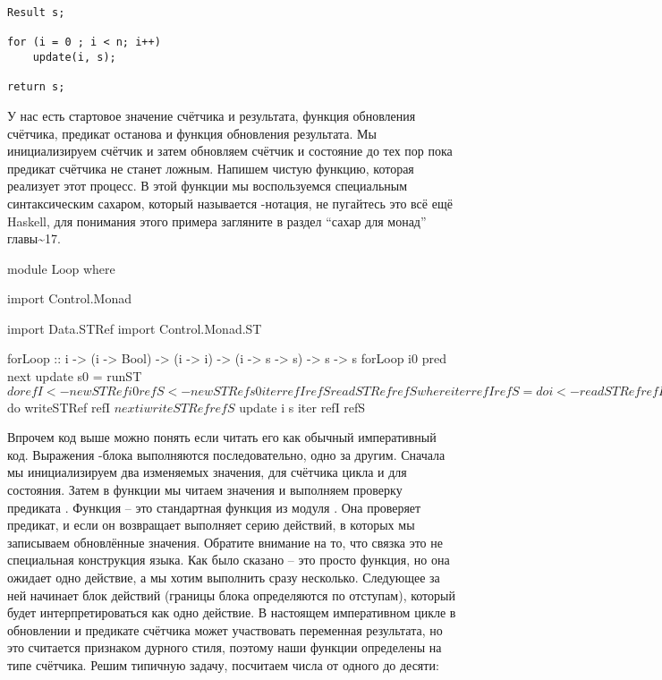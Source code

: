 \begin{verbatim}
Result s;

for (i = 0 ; i < n; i++)
    update(i, s);

return s;
\end{verbatim}

У нас есть стартовое значение счётчика и результата, функция обновления
счётчика, предикат останова и функция обновления результата. Мы
инициализируем счётчик и затем обновляем счётчик и состояние до тех пор
пока предикат счётчика не станет ложным. Напишем чистую функцию, которая
реализует этот процесс. В этой функции мы воспользуемся специальным
синтаксическим сахаром, который называется -нотация, не пугайтесь
это всё ещё Haskell, для понимания этого примера загляните в раздел
``сахар для монад'' главы\textasciitilde{}17.


\begin{code}
module Loop where

import Control.Monad

import Data.STRef
import Control.Monad.ST

forLoop ::  i -> (i -> Bool) -> (i -> i) -> (i -> s -> s) -> s -> s
forLoop i0 pred next update s0 = runST $ do
    refI <- newSTRef i0
    refS <- newSTRef s0
    iter refI refS
    readSTRef refS
    where iter refI refS = do
            i <- readSTRef refI
            s <- readSTRef refS
            when (pred i) $ do
                writeSTRef refI $ next i
                writeSTRef refS $ update i s
                iter refI refS
\end{code}

Впрочем код выше можно понять если читать его как обычный императивный
код. Выражения -блока выполняются последовательно, одно за
другим. Сначала мы инициализируем два изменяемых значения, для счётчика
цикла и для состояния. Затем в функции  мы читаем значения и
выполняем проверку предиката . Функция  -- это
стандартная функция из модуля . Она проверяет
предикат, и если он возвращает  выполняет серию действий, в
которых мы записываем обновлённые значения. Обратите внимание на то, что
связка  это не специальная конструкция языка. Как было
сказано  -- это просто функция, но она ожидает одно действие, а
мы хотим выполнить сразу несколько. Следующее за ней  начинает
блок действий (границы блока определяются по отступам), который будет
интерпретироваться как одно действие. В настоящем императивном цикле в
обновлении и предикате счётчика может участвовать переменная результата,
но это считается признаком дурного стиля, поэтому наши функции
определены на типе счётчика. Решим типичную задачу, посчитаем числа от
одного до десяти:


